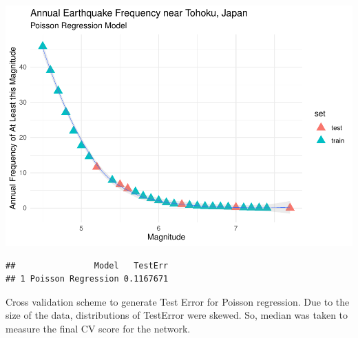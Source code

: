 \documentclass[
]{article}
\newenvironment{Shaded}{\begin{snugshade}}{\end{snugshade}}
\newcommand{\AlertTok}[1]{\textcolor[rgb]{0.94,0.16,0.16}{#1}}
\newcommand{\AttributeTok}[1]{\textcolor[rgb]{0.77,0.63,0.00}{#1}}
\newcommand{\CommentTok}[1]{\textcolor[rgb]{0.56,0.35,0.01}{\textit{#1}}}
\newcommand{\DecValTok}[1]{\textcolor[rgb]{0.00,0.00,0.81}{#1}}
\newcommand{\FunctionTok}[1]{\textcolor[rgb]{0.00,0.00,0.00}{#1}}
\newcommand{\NormalTok}[1]{#1}
\newcommand{\OtherTok}[1]{\textcolor[rgb]{0.56,0.35,0.01}{#1}}
\newcommand{\SpecialCharTok}[1]{\textcolor[rgb]{0.00,0.00,0.00}{#1}}
\newcommand{\StringTok}[1]{\textcolor[rgb]{0.31,0.60,0.02}{#1}}
\begin{document}
\includegraphics{Appendix_eq_files/figure-latex/unnamed-chunk-3-1.pdf}

\begin{Shaded}
\end{Shaded}

\begin{verbatim}
##                Model   TestErr
## 1 Poisson Regression 0.1167671
\end{verbatim}

Cross validation scheme to generate Test Error for Poisson regression.
Due to the size of the data, distributions of TestError were skewed. So,
median was taken to measure the final CV score for the network.
\end{document}
